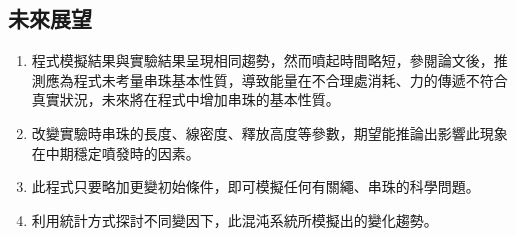 \documentclass[11pt,twoside,b5paper]{article}
\begin{document}
\subsection{未來展望}
\begin{enumerate}
    \item 程式模擬結果與實驗結果呈現相同趨勢，然而噴起時間略短，參閱論文後，推測應為程式未考量串珠基本性質，導致能量在不合理處消耗、力的傳遞不符合真實狀況，未來將在程式中增加串珠的基本性質。
    \item 改變實驗時串珠的長度、線密度、釋放高度等參數，期望能推論出影響此現象在中期穩定噴發時的因素。
    \item 此程式只要略加更變初始條件，即可模擬任何有關繩、串珠的科學問題。
    \item 利用統計方式探討不同變因下，此混沌系統所模擬出的變化趨勢。
\end{enumerate}

\medskip
\renewcommand{\refname}{\S\quad 參考資料}
\nocite{*}


\end{document}
